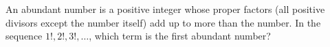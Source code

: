 An abundant number is a positive integer whose proper factors (all positive divisors except the number itself) add up to more than the number. In the sequence $1!,2!,3!,\dots$, which term is the first abundant number?
